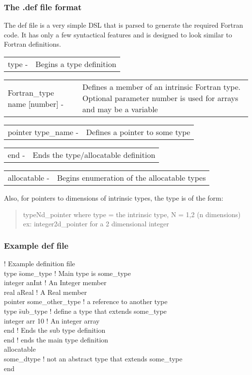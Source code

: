 \documentclass{article}
\begin{document}
\subsubsection{The .def file format}
\newcommand{\syn}[2]{
   \begin{tabular}{lp{0.7\textwidth}}
      #1 - & #2
   \end{tabular}
}
The def file is a very simple DSL that is parsed to generate the required Fortran code. It has only a few syntactical features and is designed to look similar to Fortran definitions.
\begin{list}{}{}
\item \syn {type}{Begins a type definition}
\item \syn{Fortran\_type name [number]}{Defines a member of an intrinsic Fortran type. Optional parameter number is used for arrays and may be a variable}
\item \syn{pointer type\_name}{Defines a pointer to some type}
\item \syn{end}{Ends the type/allocatable definition}
\item \syn{allocatable}{Begins enumeration of the allocatable types}
\end{list}
Also, for pointers to dimensions of intrinsic types, the type is of the form:
\begin{quote}
   typeNd\_pointer where type = the intrinsic type, N = 1,2 (n dimensions) \\
   ex: integer2d\_pointer for a 2 dimensional integer
\end{quote}
\subsubsection{Example def file}
\begin{tabbing}
! Example definition file \\
type \= some\_type ! Main type is some\_type \\
\> integer anInt ! An Integer member \\
\> real aReal ! A Real member \\
\> pointer some\_other\_type ! a reference to another type \\
\> type \= sub\_type ! define a type that extends some\_type \\
\> \> integer arr 10 ! An integer array \\
\> end ! Ends the sub type definition \\
end ! ends the main type definition \\
allocatable \\
\> some\_dtype ! not an abstract type that extends some\_type \\
end \\
\end{tabbing}
\end{document}

